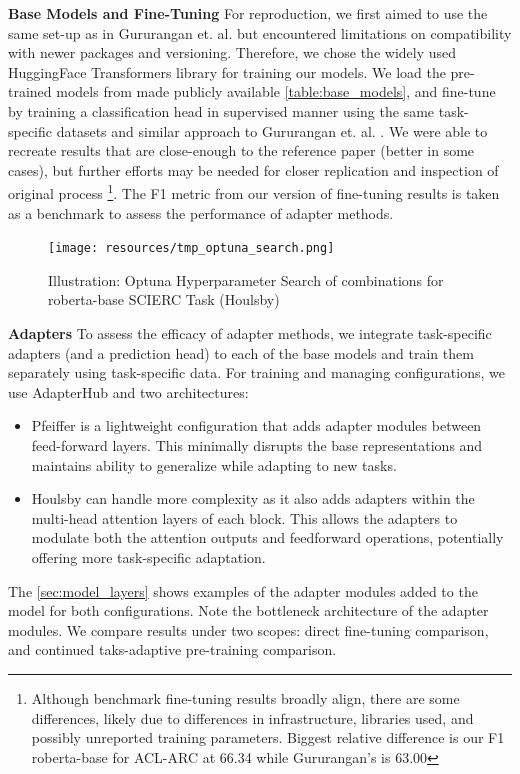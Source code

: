 \documentclass[10pt,twocolumn,letterpaper]{article}
\begin{document}
\textbf{Base Models and Fine-Tuning} For reproduction, we first aimed to use the same set-up as in Gururangan et. al. \cite{allenai_dont_stop_pretraining} but encountered limitations on compatibility with newer packages and versioning. Therefore, we chose the widely used HuggingFace Transformers library \cite{transformers} for training our models. We load the pre-trained models from \cite{allenai_dont_stop_pretraining} made publicly available \ref{table:base_models}, and fine-tune by training a classification head in supervised manner using the same task-specific datasets and similar approach to Gururangan et. al. \cite{gururangan2020dont}. We were able to recreate results that are close-enough to the reference paper (better in some cases), but further efforts may be needed for closer replication and inspection of original process \footnote{Although benchmark fine-tuning results broadly align, there are some differences, likely due to differences in infrastructure, libraries used, and possibly unreported training parameters. Biggest relative difference is our F1 roberta-base for ACL-ARC at 66.34 while Gururangan’s is 63.00}. The F1 metric from our version of fine-tuning results is taken as a benchmark to assess the performance of adapter methods.

\begin{figure}[h]
    \centering 
    \texttt{[image: resources/tmp\_optuna\_search.png]}
    \caption{Illustration: Optuna Hyperparameter Search of combinations for roberta-base SCIERC Task (Houlsby)}
    \label{fig:optuna_search}
\end{figure}

\textbf{Adapters}  To assess the efficacy of adapter methods, we integrate task-specific adapters (and a prediction head) to each of the base models and train them separately using task-specific data. For training and managing configurations, we use AdapterHub \cite{adapterhub_overview} and two architectures: 
\begin{itemize}
\item Pfeiffer \cite{pfeiffer2020adapterhub} is a lightweight configuration that adds adapter modules between feed-forward layers. This minimally disrupts the base representations and maintains ability to generalize while adapting to new tasks. 
\item Houlsby \cite{houlsby2019parameter} can handle more complexity as it also adds adapters within the multi-head attention layers of each block. This allows the adapters to modulate both the attention outputs and feedforward operations, potentially offering more task-specific adaptation.
\end{itemize}
The \ref{sec:model_layers} shows examples of the adapter modules added to the model for both configurations. Note the bottleneck architecture of the adapter modules. We compare results under two scopes: direct fine-tuning comparison, and continued taks-adaptive pre-training comparison.
\end{document}
